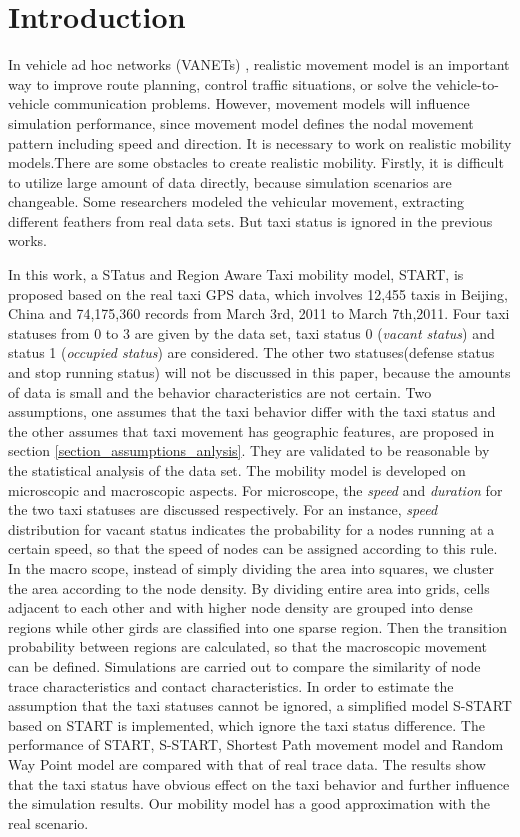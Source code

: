 \section{Introduction}
\label{section_introduction}

In vehicle ad hoc networks (VANETs) \cite{4068700}, realistic movement model is an important way to improve route planning, control traffic situations, or solve the vehicle-to-vehicle communication problems. However, movement models will influence simulation performance, since movement model defines the nodal movement pattern including speed and direction. It is necessary to work on realistic mobility models.There are some obstacles to create realistic mobility. Firstly, it is difficult to utilize large amount of data directly, because simulation scenarios are changeable. Some researchers \cite{KimKotz-99,HuangZhu-88} modeled the vehicular movement, extracting different feathers from real data sets. But taxi status is ignored in the previous works.

In this work, a STatus and Region Aware Taxi mobility model, START, is proposed based on the real taxi GPS data, which involves 12,455 taxis in Beijing, China and 74,175,360 records from March 3rd, 2011 to March 7th,2011. Four taxi statuses from 0 to 3 are given by the data set, taxi status 0 (\emph{vacant status}) and status 1 (\emph{occupied status}) are considered. The other two statuses(defense status and stop running status) will not be discussed in this paper, because the amounts of data is small and the behavior characteristics are not certain.
Two assumptions, one assumes that the taxi behavior differ with the taxi status and the other assumes that taxi movement has geographic features, are proposed in section \ref{section_assumptions_anlysis}. They are validated to be reasonable by the statistical analysis of the data set. The mobility model is developed on microscopic and macroscopic aspects. For microscope, the \emph{speed} and \emph{ duration } for the two taxi statuses are discussed respectively. For an instance, \emph{speed} distribution for vacant status indicates the probability for a nodes running at a certain speed, so that the speed of nodes can be assigned according to this rule.
In the macro scope, instead of simply dividing the area into squares, we cluster the area according to the node density. By dividing entire area into grids, cells adjacent to each other and with higher node density are grouped into dense regions while other girds are classified into one sparse region. Then the transition probability between regions are calculated, so that the macroscopic movement can be defined.
Simulations are carried out to compare the similarity of node trace characteristics and contact characteristics. In order to estimate the assumption that the taxi statuses cannot be ignored, a simplified model S-START based on START is implemented, which ignore the taxi status difference. The performance of START, S-START, Shortest Path movement model and Random Way Point model are compared with that of real trace data.
The results show that the taxi status have obvious effect on the taxi behavior and further influence the simulation results. Our mobility model has a good approximation with the real scenario.

